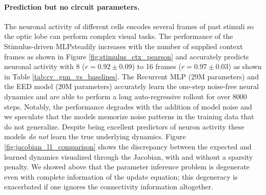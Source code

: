 \documentclass{article}
\def\stimbase{Stimulus-driven MLP}
\def\eedbase{EED model}
\def\mlpbase{Recurrent MLP}
\begin{document}

\paragraph{Prediction but no circuit parameters.}
The neuronal activity of different cells encodes several frames of past stimuli so the optic lobe can perform complex visual tasks. The performance of the \stimbase steadily increases with the number of supplied context frames as shown in Figure \ref{fig:stimulus_ctx_pearson} and accurately predicts neuronal activity with 8 ($r=0.92 \pm 0.09$) to 16 frames ($r=0.97 \pm 0.03$) as shown in Table \ref{tab:cv_gnn_vs_baselines}.
The \mlpbase{ }(29M parameters) and the \eedbase{ }(20M parameters) accurately learn the one-step noise-free neural dynamics and are able to perform a long auto-regressive rollout for over 8000 steps. Notably, the performance degrades with the addition of model noise and we speculate that the models memorize noise patterns in the training data that do not generalize. Despite being excellent predictors of neuron activity these models \emph{do not} learn the true underlying dynamics. Figure \ref{fig:jacobian_l1_comparison} shows the discrepancy between the expected and learned dynamics visualized through the Jacobian, with and without a sparsity penalty. We showed above that the parameter inference problem is degenerate even with complete information of the update equation; this degeneracy is exacerbated if one ignores the connectivity information altogether.
\end{document}
